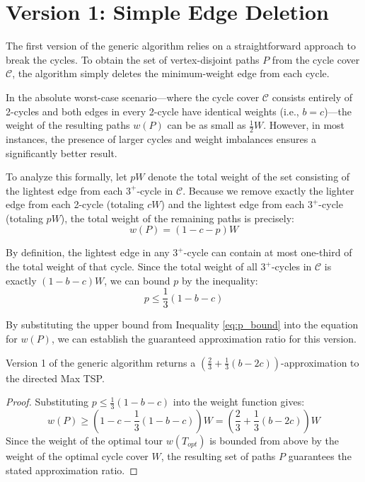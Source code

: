 \section{Version 1: Simple Edge Deletion} \label{sec:kps_v1}

The first version of the generic algorithm relies on a straightforward approach
to break the cycles. To obtain the set of vertex-disjoint paths $P$ from the
cycle cover $\mathcal{C}$, the algorithm simply deletes the minimum-weight edge
from each cycle.

In the absolute worst-case scenario—where the cycle cover $\mathcal{C}$ consists
entirely of 2-cycles and both edges in every 2-cycle have identical weights
(i.e., $b = c$)—the weight of the resulting paths $w(P)$ can be as small as
$\frac{1}{2}W$. However, in most instances, the presence of larger cycles and
weight imbalances ensures a significantly better result.

To analyze this formally, let $pW$ denote the total weight of the set consisting
of the lightest edge from each $3^+$-cycle in $\mathcal{C}$. Because we remove
exactly the lighter edge from each 2-cycle (totaling $cW$) and the lightest edge
from each $3^+$-cycle (totaling $pW$), the total weight of the remaining paths
is precisely:
\begin{equation}
w(P) = (1 - c - p)W
\end{equation}

By definition, the lightest edge in any $3^+$-cycle can contain at most
one-third of the total weight of that cycle. Since the total weight of all
$3^+$-cycles in $\mathcal{C}$ is exactly $(1 - b - c)W$, we can bound $p$ by the
inequality:
\begin{equation} \label{eq:p_bound}
p \le \frac{1}{3}(1 - b - c)
\end{equation}

By substituting the upper bound from Inequality \ref{eq:p_bound} into the
equation for $w(P)$, we can establish the guaranteed approximation ratio for
this version.

\begin{theorem} \label{lemma:version1}
Version 1 of the generic algorithm returns a $\left(\frac{2}{3} + \frac{1}{3}(b
- 2c)\right)$-approximation to the directed Max TSP.
\end{theorem}

\begin{proof}
Substituting $p \le \frac{1}{3}(1 - b - c)$ into the weight function gives:
\begin{equation}
w(P) \ge \left(1 - c - \frac{1}{3}(1 - b - c)\right)W = \left(\frac{2}{3} + \frac{1}{3}(b - 2c)\right)W
\end{equation}
Since the weight of the optimal tour $w(T_{opt})$ is bounded from above by the
weight of the optimal cycle cover $W$, the resulting set of paths $P$ guarantees
the stated approximation ratio.
\end{proof}

